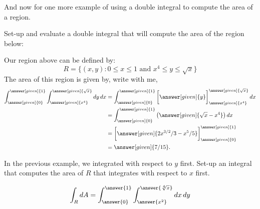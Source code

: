 \documentclass{ximera}
\begin{document}
And now for one more example of using a double integral to compute the
area of a region.

\begin{example}
  Set-up and evaluate a double integral that will compute the area of
  the region below:
  \begin{image}
  \end{image}
  \begin{explanation}
    Our region above can be defined by:
    \[
    R=\{(x,y):\text{$0\leq x\leq 1$ and $x^4\leq y\leq \sqrt{x}$}\}
    \]
    The area of this region is given by, write with me, 
    \begin{align*}
      \int_{\answer[given]{0}}^{\answer[given]{1}}\int_{\answer[given]{x^4}}^{\answer[given]{\sqrt{x}}}\d y \d x &= \int_{\answer[given]{0}}^{\answer[given]{1}} \eval{\answer[given]{y}}_{\answer[given]{x^4}}^{\answer[given]{\sqrt{x}}} \d x\\
      &=  \int_{\answer[given]{0}}^{\answer[given]{1}} \left(\answer[given]{\sqrt{x}-x^4}\right) \d x\\
      &=  \eval{\answer[given]{2x^{3/2}/3 - x^5/5}}_{\answer[given]{0}}^{\answer[given]{1}}\\
      &= \answer[given]{7/15}. 
    \end{align*}
  \end{explanation}
\end{example}

\begin{question}
  In the previous example, we integrated with respect to $y$
  first. Set-up an integral that computes the area of $R$ that
  integrates with respect to $x$ first.
  \begin{prompt}
    \[
    \int_R \d A = \int_{\answer{0}}^{\answer{1}}\int_{\answer{x^2}}^{\answer{\sqrt[4]{x}}} \d x \d y
    \]
  \end{prompt}
\end{question}
\end{document}
